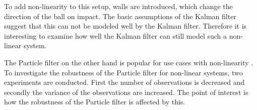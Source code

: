 \documentclass[conference]{IEEEtran}
\begin{document}
To add non-linearity to this setup, walls are introduced, which change the direction of the ball on impact.
The basic assumptions of the Kalman filter suggest that this can not be modeled well by the Kalman filter.
Therefore it is interesting to examine how well the Kalman filter can still model such a non-linear system. 

The Particle filter on the other hand is popular for use cases with non-linearity \cite{}. %
To investigate the robustness of the Particle filter for non-linear systems, two experiments are conducted.
First the number of observations is decreased and secondly the variance of the observations are increased. 
The point of interest is how the robustness of the Particle filter is affected by this.


\end{document}
